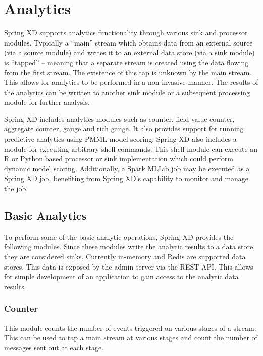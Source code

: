 \section{Analytics}
\label{sec:Analytics}

Spring XD supports analytics functionality through various sink and processor modules.
Typically a ``main'' stream which obtains data from an external source (via
a source module) and writes it to an external data store (via a sink module)
is ``tapped'' -- meaning that a separate stream is created using the data
flowing from the first stream. The existence of this tap is unknown by the
main stream. This allows for analytics to be performed in a non-invasive manner.
The results of the analytics can be written to another sink module or a
subsequent processing module for further analysis.

\par

Spring XD includes analytics modules such as counter, field value counter,
aggregate counter, gauge and rich gauge. It also provides support for running
predictive analytics using PMML model scoring. Spring XD also includes a module
for executing arbitrary shell commands. This shell module can execute an R or
Python based processor or sink implementation which could perform dynamic model
scoring. Additionally, a Spark MLLib job may be executed as a Spring XD job,
benefiting from Spring XD's capability to monitor and manage the job.

\subsection {Basic Analytics}

To perform some of the basic analytic operations, Spring XD provides the following
modules. Since these modules write the analytic results to a data store, they are
considered sinks. Currently in-memory and Redis are supported data stores. This
data is exposed by the admin server via the REST API. This allows for simple
development of an application to gain access to the analytic data results.

\subsubsection {Counter}

This module counts the number of events triggered on various stages of a stream.
This can be used to tap a main stream at various stages and count the number
of messages sent out at each stage.


